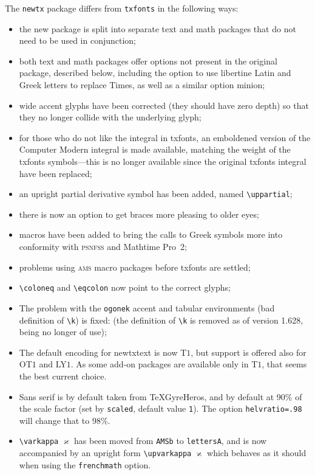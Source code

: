 \documentclass[\fsc]{article}
\theoremstyle{oldplain}
\theoremstyle{plain}
\begin{document}
The {\tt newtx} package differs from {\tt txfonts} in the following ways:
\begin{itemize}
\item
the new package is split into separate text and math packages that do not need to be used in conjunction;
\item both text and math packages offer options not present in the original package, described below, including the option to use \textsf{libertine} Latin and Greek letters to replace \textsf{Times}, as well as a similar option \textsf{minion};
\item wide accent glyphs have been corrected (they should have zero depth) so that they no longer collide with the underlying glyph;
\item for those who do not like the integral in \textsf{txfonts}, an emboldened version of the Computer Modern integral is made available, matching the weight of the \textsf{txfonts} symbols---this is no longer available since the original \textsf{txfonts} integral have been replaced;
\item an upright partial derivative symbol has been added, named \verb|\uppartial|;
\item there is now an option to get braces more pleasing to older eyes;
\item macros have been added to bring the calls to Greek symbols more into conformity with \textsc{psnfss} and Mathtime Pro~2;
\item problems using \textsc{ams} macro packages before \textsf{txfonts} are settled;
\item \verb|\coloneq| and \verb|\eqcolon| now point to the correct glyphs;
\item The problem with the {\tt ogonek} accent  and tabular environments (bad definition of \verb|\k|) is fixed: (the definition of \verb|\k| is removed as of version 1.628, being no longer of use);
\item The default encoding for \textsf{newtxtext} is now T$1$, but support is offered also for OT$1$ and LY$1$. As some add-on packages are available only in T$1$, that seems the best current choice.
\item Sans serif is by default taken from TeXGyreHeros, and by default at 90\% of the scale factor (set by {\tt scaled}, default value {\tt1}). The option {\tt helvratio=.98} will change that to 98\%.
\item \verb|\varkappa| $\varkappa$ has been moved from {\tt AMSb} to {\tt lettersA}, and is now accompanied by an upright form \verb|\upvarkappa| $\upvarkappa$ which behaves as it should when using the {\tt frenchmath} option.
\end{itemize}
\end{document}
